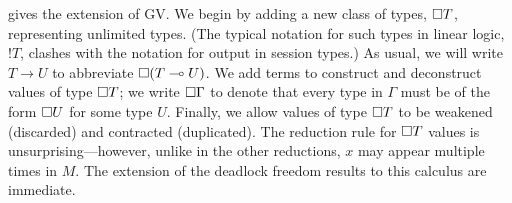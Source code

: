 \documentclass[oribibl,orivec,envcountsame]{llncs}
\begin{document}
 gives the extension of GV.  We begin by adding a new class of types, $\Box T$, representing unlimited types.  (The typical notation for such types in linear logic, ${!T}$,
clashes with the notation for output in session types.)  As usual, we will write $T \to U$ to
abbreviate $\Box (T \multimap U)$.  We add terms to construct and deconstruct values of type
$\Box T$; we write $\Box \Gamma$ to denote that every type in $\Gamma$ must be of the
form $\Box U$ for some type $U$.  Finally, we allow values of type $\Box T$ to be
weakened (discarded) and contracted (duplicated).  The reduction rule for $\Box T$ values is
unsurprising---however, unlike in the other reductions, $x$ may appear multiple times in $M$.  The
extension of the deadlock freedom results to this calculus are immediate.
\end{document}
